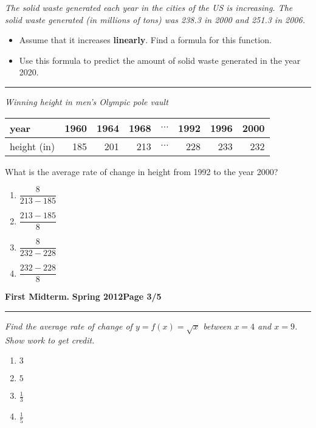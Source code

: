 \documentclass[12pt]{article}
\begin{document}
\bigskip
{\problem[10 pts] \em The solid waste generated each year in the
  cities of the US is increasing.  The solid waste generated (in
  millions of tons) was 238.3 in 2000 and 251.3 in 2006.}
\begin{itemize}
\item Assume that it increases {\bf linearly}. Find a formula for
  this function.
\vspace{3.5cm}
\begin{flushright}
\end{flushright}
\item Use this formula to predict the amount of solid waste generated
  in the year 2020.
\vspace{3.5cm}
\begin{flushright}
\end{flushright}
\end{itemize}
\hrule
{\problem[10 pts] \em Winning height in men's Olympic pole vault}
\begin{center}
\begin{tabular}{l|r|r|r|c|r|r|r|}
\hline
year & 1960 & 1964 & 1968 & $\cdots$ & 1992 & 1996 & 2000 \\
\hline
height (in) & 185 & 201 & 213 & $\cdots$ & 228 & 233 & 232 \\
\hline
\end{tabular}
\end{center}
What is the average rate of change in height from 1992 to the year 2000?
\begin{enumerate}
\item $\dfrac{8}{213-185}$
\item $\dfrac{213-185}{8}$
\item $\dfrac{8}{232-228}$
\item $\dfrac{232-228}{8}$
\end{enumerate}
\newpage

\hfill{\large\bf First Midterm.}\hfill{\large\bf
  Spring 2012}\hfill{\large\bf Page 3/5}\hrule

\bigskip
{\problem[15 pts] \em Find the average rate of change of $y=f(x) =
  \sqrt{x}$ between $x=4$ and $x=9$.  Show work to get credit.}
\begin{enumerate}
\item $3$
\item $5$
\item $\tfrac{1}{3}$
\item $\tfrac{1}{5}$
\end{enumerate}
\end{document}
